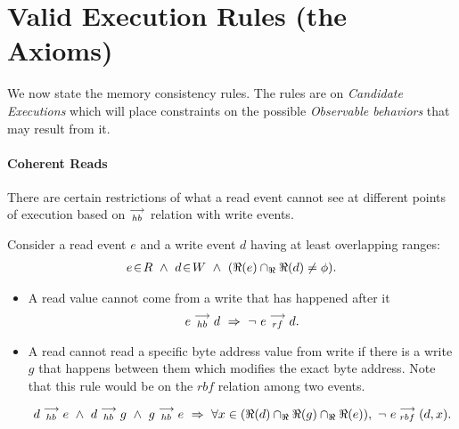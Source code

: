         
    \section{Valid Execution Rules (the Axioms)}
        We now state the memory consistency rules. The rules are on \textit{Candidate Executions} which will place constraints on the possible \textit{Observable behaviors} that may result from it. 
         
        \paragraph{Coherent Reads} 
        
            There are certain restrictions of what a read event cannot see at different points of execution based on $\stackrel{\longrightarrow}{_{hb}}$ relation with write events. 

            Consider a read event $e$ and a write event $d$ having at least overlapping ranges:
            \begin{align*}
                \event{e}{R} \ \wedge \ 
                \event{d}{W} \ \wedge \
                (\Re(e) \cap_\Re \Re(d) \neq \phi).
            \end{align*}

            \begin{itemize}
                \item A read value cannot come from a write that has happened after it 
                    \[\reln{e}{hb}{d}\ \Rightarrow{}\ \neg \ \reln{e}{rf}{d}.\]
                
                \item A read cannot read a specific byte address value from write if there is a write $g$ that happens between them which modifies the exact byte address. Note that this rule would be on the $rbf$ relation among two events. 
                
                    \[
                        \reln{d}{hb}{e}
                        \ \wedge \ 
                        \reln{d}{hb}{g} \ \wedge \  \reln{g}{hb}{e}
                        \ \Rightarrow{} \
                        \forall x \in (\Re(d) \cap_\Re \Re(g) \cap_\Re \Re(e)), \ \neg \ \reln{e}{rbf}{(d,x)}.
                    \]
                    
            \end{itemize}
         
